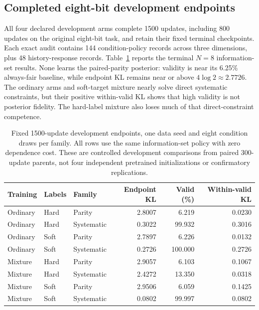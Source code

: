 \subsection{Completed eight-bit development endpoints}
All four declared development arms complete 1500 updates, including 800 updates on the original eight-bit task, and retain their fixed terminal checkpoints. Each exact audit contains 144 condition-policy records across three dimensions, plus 48 history-response records. Table~\ref{tab:terminaln8} reports the terminal $N=8$ information-set results. None learns the paired-parity posterior: validity is near its 6.25\% always-fair baseline, while endpoint KL remains near or above $4\log2\approx2.7726$. The ordinary arms and soft-target mixture nearly solve direct systematic constraints, but their positive within-valid KL shows that high validity is not posterior fidelity. The hard-label mixture also loses much of that direct-constraint competence.

\begin{table}[ht]
\centering\small
\begin{tabular}{lllrrr}
\toprule
Training & Labels & Family & Endpoint KL & Valid (\%) & Within-valid KL \\
\midrule
Ordinary & Hard & Parity & 2.8007 & 6.219 & 0.0230 \\
Ordinary & Hard & Systematic & 0.3022 & 99.932 & 0.3016 \\
Ordinary & Soft & Parity & 2.7897 & 6.226 & 0.0132 \\
Ordinary & Soft & Systematic & 0.2726 & 100.000 & 0.2726 \\
Mixture & Hard & Parity & 2.9057 & 6.103 & 0.1067 \\
Mixture & Hard & Systematic & 2.4272 & 13.350 & 0.0318 \\
Mixture & Soft & Parity & 2.9506 & 6.059 & 0.1425 \\
Mixture & Soft & Systematic & 0.0802 & 99.997 & 0.0802 \\
\bottomrule
\end{tabular}
\caption{Fixed 1500-update development endpoints, one data seed and eight condition draws per family. All rows use the same information-set policy with zero dependence cost. These are controlled development comparisons from paired 300-update parents, not four independent pretrained initializations or confirmatory replications.}
\label{tab:terminaln8}
\end{table}

